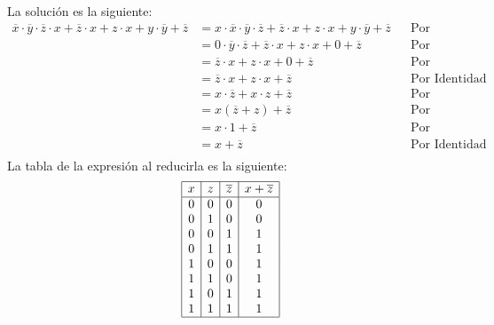 \documentclass[answers]{exam}
\begin{document}
\begin{questions}
   \vspace{-2em}
  \begin{solution}
    La solución es la siguiente:
    \begin{align*}
      \overline{x} \cdot \overline{y} \cdot \overline{z} \cdot x +%
      \overline{z} \cdot x + z \cdot x + y \cdot \overline{y} + \overline{z}
      &= x \cdot \overline{x} \cdot \overline{y} \cdot \overline{z} +%
        \overline{z} \cdot x + z \cdot x + y \cdot \overline{y} + \overline{z}%
      && \text{Por Conmutatividad} \\
      &= 0 \cdot \overline{y} \cdot \overline{z} +%
        \overline{z} \cdot x + z \cdot x + 0 + \overline{z} && \text{Por Complemento} \\
      &= \overline{z} \cdot x + z \cdot x + 0 + \overline{z} && \text{Por Aniquilación} \\
      &= \overline{z} \cdot x + z \cdot x + \overline{z} && \text{Por Identidad} \\
      &=  x \cdot \overline{z} + x \cdot z + \overline{z} && \text{Por Conmutatividad} \\
      &=  x (\overline{z} + z) + \overline{z} && \text{Por Distributividad} \\
      &=  x \cdot 1 + \overline{z} && \text{Por Complemento} \\
      &=  x + \overline{z} && \text{Por Identidad} \\
    \end{align*}
    La tabla de la expresión al reducirla es la siguiente:
    \begin{gather*}
      \begin{array}{|c|c|c|c|}
        \hline
        x & z & \overline{z} & x + \overline{z} \\
        \hline
        0 & 0 & 0 & 0 \\
        0 & 1 & 0 & 0 \\
        0 & 0 & 1 & 1 \\
        0 & 1 & 1 & 1 \\
        1 & 0 & 0 & 1 \\
        1 & 1 & 0 & 1 \\
        1 & 0 & 1 & 1 \\
        1 & 1 & 1 & 1 \\
        \hline

\end{array}
\end{gather*}
\end{solution}
\end{questions}
\end{document}
